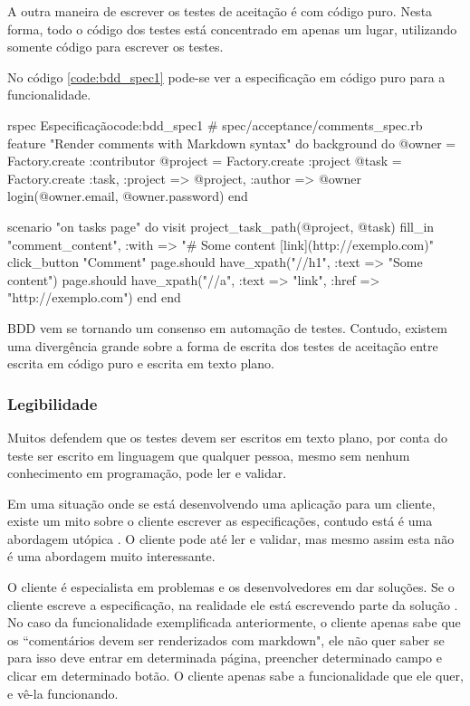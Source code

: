 A outra maneira de escrever os testes de aceitação é com código puro. Nesta forma, todo o código dos testes está concentrado em apenas um lugar, utilizando somente código para escrever os testes.

No código \ref{code:bdd_spec1} pode-se ver a especificação em código puro para a funcionalidade.

\begin{mycode}{rspec}%
{Especificação}{code:bdd_spec1}
# spec/acceptance/comments_spec.rb
feature "Render comments with Markdown syntax" do
  background do
    @owner = Factory.create :contributor
    @project = Factory.create :project
    @task = Factory.create :task, :project => @project, :author => @owner
    login(@owner.email, @owner.password)
  end

  scenario "on tasks page" do
    visit project_task_path(@project, @task)
    fill_in "comment_content", :with => "# Some content [link](http://exemplo.com)"
    click_button "Comment"
    page.should have_xpath("//h1", :text => "Some content")
    page.should have_xpath("//a", :text => "link", :href => "http://exemplo.com")
  end
end
\end{mycode}


BDD vem se tornando um consenso em automação de testes. Contudo, existem uma divergência grande sobre a forma de escrita dos testes de aceitação entre escrita em código puro e escrita em texto plano.

\subsubsection{Legibilidade} %
\label{subsub:legibilidade}

Muitos defendem que os testes devem ser escritos em texto plano, por conta do teste ser escrito em linguagem que qualquer pessoa, mesmo sem nenhum conhecimento em programação, pode ler e validar.

Em uma situação onde se está desenvolvendo uma aplicação para um cliente, existe um mito sobre o cliente escrever as especificações, contudo está é uma abordagem utópica \cite{SteakOverCucumber, CucumberForVegetarians, ClientsWritingCucumber}. O cliente pode até ler e validar, mas mesmo assim esta não é uma abordagem muito interessante.

O cliente é especialista em problemas e os desenvolvedores em dar soluções. Se o cliente escreve a especificação, na realidade ele está escrevendo parte da solução \cite{SteakOverCucumber}. No caso da funcionalidade exemplificada anteriormente, o cliente apenas sabe que os ``comentários devem ser renderizados com markdown", ele não quer saber se para isso deve entrar em determinada página, preencher determinado campo e clicar em determinado botão. O cliente apenas sabe a funcionalidade que ele quer, e vê-la funcionando.

